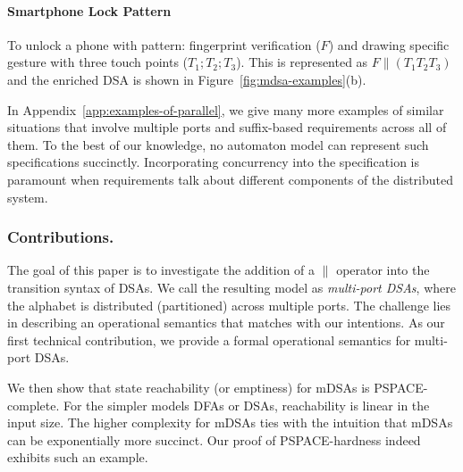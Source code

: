 \documentclass[runningheads,envcountsame]{llncs}
\begin{document}
   \paragraph*{Smartphone Lock Pattern} To unlock a phone with pattern: fingerprint verification ($F$) and drawing specific gesture with three touch points ($T_1;T_2;T_3$). This is represented as $F \parallel (T_1 T_2 T_3)$ and the enriched DSA is shown in Figure~\ref{fig:mdsa-examples}(b).
   
  In Appendix~\ref{app:examples-of-parallel}, we give many more examples of similar situations that involve multiple ports and suffix-based requirements across all of them. To the best of our knowledge, no automaton model can represent such specifications succinctly. Incorporating concurrency into the specification is paramount when requirements talk about different components of the distributed system. 
  
  \subsubsection*{Contributions.} The goal of this paper is to investigate the addition of a $\parallel$ operator into the transition syntax of DSAs. We call the resulting model as \emph{multi-port DSAs}, where the alphabet is distributed (partitioned) across multiple ports. The challenge lies in describing an operational semantics that matches with our intentions. As our first technical contribution, we provide a formal operational semantics for multi-port DSAs. 
  
  We then show that state reachability (or emptiness) for mDSAs is PSPACE-complete. For the simpler models DFAs or DSAs, reachability is linear in the input size. The higher complexity for mDSAs ties with the intuition that mDSAs can be exponentially more succinct. Our proof of PSPACE-hardness indeed exhibits such an example. 
\end{document}
